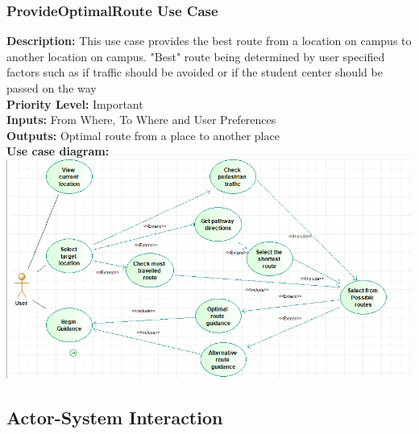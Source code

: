 \documentclass[a4paper,12pt]{article}
\begin{document}
\subsubsection{ProvideOptimalRoute Use Case}
\textbf{Description: } This use case provides the best route from a location on campus to another location on campus. "Best" route being determined by user specified factors such as if traffic should be avoided or if the student center should be passed on the way\\
\textbf{Priority Level: } Important\\
\textbf{Inputs:} From Where, To Where and User Preferences\\
\textbf{Outputs:} Optimal route from a place to another place\\
\textbf{Use case diagram: }\\
\includegraphics[width=\textwidth]{images/op_route.png}

\subsection{Actor-System Interaction}
\end{document}

